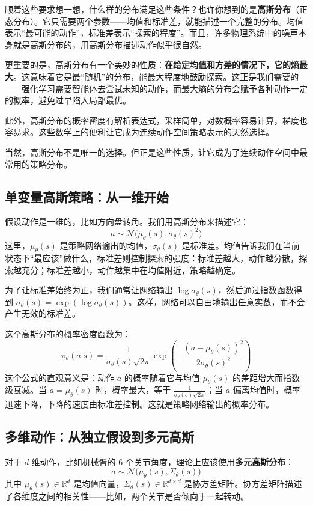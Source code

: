 \documentclass[lang=cn,zihao=-4,a4paper,fontset=windows]{beautybook}
\begin{document}
顺着这些要求想一想，什么样的分布满足这些条件？也许你想到的是\textbf{高斯分布}（正态分布）。它只需要两个参数——均值和标准差，就能描述一个完整的分布。均值表示“最可能的动作”，标准差表示“探索的程度”。而且，许多物理系统中的噪声本身就是高斯分布的，用高斯分布描述动作似乎很自然。

更重要的是，高斯分布有一个美妙的性质：\textbf{在给定均值和方差的情况下，它的熵最大}。这意味着它是最“随机”的分布，能最大程度地鼓励探索。这正是我们需要的——强化学习需要智能体去尝试未知的动作，而最大熵的分布会赋予各种动作一定的概率，避免过早陷入局部最优。

此外，高斯分布的概率密度有解析表达式，采样简单，对数概率容易计算，梯度也容易求。这些数学上的便利让它成为连续动作空间策略表示的天然选择。

当然，高斯分布不是唯一的选择。但正是这些性质，让它成为了连续动作空间中最常用的策略分布。

\subsection{单变量高斯策略：从一维开始}

假设动作是一维的，比如方向盘转角。我们用高斯分布来描述它：
\[
a \sim \mathcal{N}\big(\mu_\theta(s), \sigma_\theta(s)^2\big)
\]
这里，$\mu_\theta(s)$ 是策略网络输出的均值，$\sigma_\theta(s)$ 是标准差。均值告诉我们在当前状态下“最应该”做什么，标准差则控制探索的强度：标准差越大，动作越分散，探索越充分；标准差越小，动作越集中在均值附近，策略越确定。

为了让标准差始终为正，我们通常让网络输出 $\log \sigma_\theta(s)$，然后通过指数函数得到 $\sigma_\theta(s) = \exp(\log \sigma_\theta(s))$。这样，网络可以自由地输出任意实数，而不会产生无效的标准差。

这个高斯分布的概率密度函数为：
\[
\pi_\theta(a|s) = \frac{1}{\sigma_\theta(s)\sqrt{2\pi}} \exp\left(-\frac{(a-\mu_\theta(s))^2}{2\sigma_\theta(s)^2}\right)
\]
这个公式的直观意义是：动作 $a$ 的概率随着它与均值 $\mu_\theta(s)$ 的差距增大而指数级衰减。当 $a = \mu_\theta(s)$ 时，概率最大，等于 $\frac{1}{\sigma_\theta(s)\sqrt{2\pi}}$；当 $a$ 偏离均值时，概率迅速下降，下降的速度由标准差控制。这就是策略网络输出的概率分布。

\subsection{多维动作：从独立假设到多元高斯}

对于 $d$ 维动作，比如机械臂的 6 个关节角度，理论上应该使用\textbf{多元高斯分布}：
\[
a \sim \mathcal{N}\big(\mu_\theta(s), \Sigma_\theta(s)\big)
\]
其中 $\mu_\theta(s) \in \mathbb{R}^d$ 是均值向量，$\Sigma_\theta(s) \in \mathbb{R}^{d\times d}$ 是协方差矩阵。协方差矩阵描述了各维度之间的相关性——比如，两个关节是否倾向于一起转动。
\end{document}

